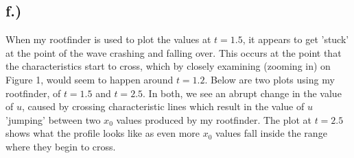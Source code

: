 \documentclass{article}
\begin{document}
\subsection*{f.)}
When my rootfinder is used to plot the values at $t=1.5$, it appears to get 'stuck' at the point of the wave crashing and falling over. This occurs at the point that the characteristics start to cross, which by closely examining (zooming in) on Figure 1, would seem to happen around $t = 1.2$. Below are two plots using my rootfinder, of $t = 1.5$ and $t = 2.5$. In both, we see an abrupt change in the value of $u$, caused by crossing characteristic lines which result in the value of $u$ 'jumping' between two $x_0$ values produced by my rootfinder. The plot at $t=2.5$ shows what the profile looks like as even more $x_0$ values fall inside the range where they begin to cross.
\end{document}
